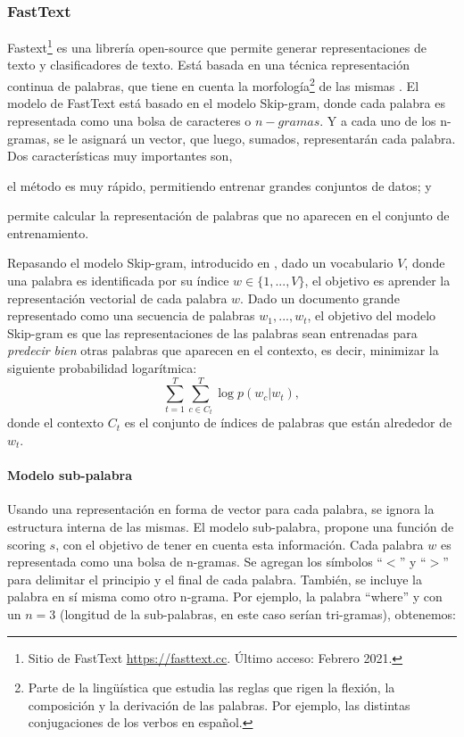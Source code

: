 \subsubsection{FastText}
Fastext\footnote{Sitio de FastText \url{https://fasttext.cc}. Último acceso: Febrero 2021.} es una librería open-source que permite generar representaciones de texto y clasificadores de texto. Está basada en una técnica representación continua de palabras, que tiene en cuenta la morfología\footnote{Parte de la lingüística que estudia las reglas que rigen la flexión, la composición y la derivación de las palabras. Por ejemplo, las distintas conjugaciones de los verbos en español.} de las mismas \citep{bojanowski2017enriching}.
El modelo de FastText está basado en el modelo Skip-gram, donde cada palabra es representada como una bolsa de caracteres o \(n-gramas\). Y a cada uno de los n-gramas, se le asignará un vector, que luego, sumados, representarán cada palabra. Dos características muy importantes son, \begin{enumerate*} [label=(\roman*)] \item el método es muy rápido, permitiendo entrenar grandes conjuntos de datos; y \item permite calcular la representación de palabras que no aparecen en el conjunto de entrenamiento. \end{enumerate*}

\bigskip Repasando el modelo Skip-gram, introducido en \citep{mikolov2013efficient}, dado un vocabulario \(V\), donde una palabra es identificada por su índice \(w \in \{1,... , V\}\), el objetivo es aprender la representación vectorial de cada palabra \(w\). Dado un documento grande representado como una secuencia de palabras \(w_1, ..., w_t\), el objetivo del modelo Skip-gram es que las representaciones de las palabras sean entrenadas para \textit{predecir bien} otras palabras que aparecen en el contexto, es decir, minimizar la siguiente probabilidad logarítmica:
\[\sum_{t=1}^{T}\sum_{c \in C_t}^{T}{\log p(w_c | w_t)},\]
donde el contexto \(C_t\) es el conjunto de índices de palabras que están alrededor de \(w_t\).

\paragraph{Modelo sub-palabra}
Usando una representación en forma de vector para cada palabra, se ignora la estructura interna de las mismas. El modelo sub-palabra, propone una función de scoring \(s\), con el objetivo de tener en cuenta esta información.
Cada palabra \(w\) es representada como una bolsa de n-gramas. Se agregan los símbolos ``\(<\)'' y ``\(>\)'' para delimitar el principio y el final de cada palabra. También, se incluye la palabra en sí misma como otro n-grama. Por ejemplo, la palabra ``where'' y con un \(n = 3\) (longitud de la sub-palabras, en este caso serían tri-gramas), obtenemos:

